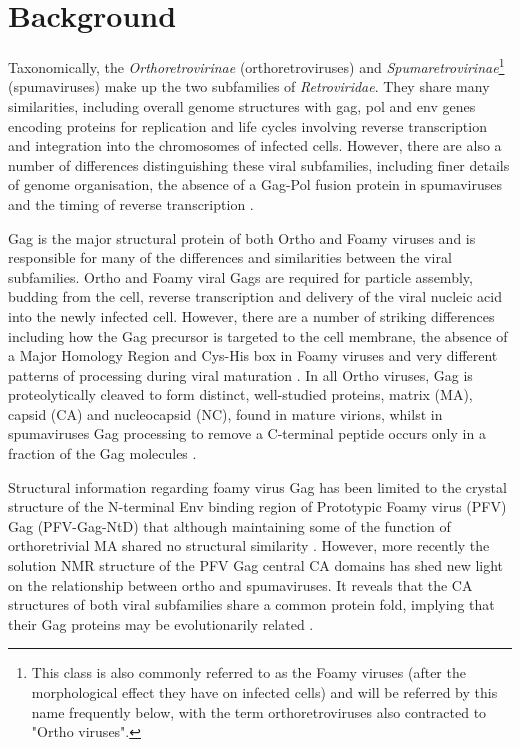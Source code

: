 \documentclass{bmcart}
\begin{document}
\section*{Background}

Taxonomically, the {\em Orthoretrovirinae} (orthoretroviruses) and {\em Spumaretrovirinae}\footnote{
This class is also commonly referred to as the Foamy viruses (after the morphological effect they have on infected cells)
and will be referred by this name frequently below, with the term orthoretroviruses also contracted to "Ortho viruses".
}
(spumaviruses) make up the two subfamilies of {\em Retroviridae}. They share many similarities, including overall genome
structures with gag, pol and env genes encoding proteins for replication and life cycles involving reverse transcription
and integration into the chromosomes of infected cells. However, there are also a number of differences distinguishing these
viral subfamilies, including finer details of genome organisation, the absence of a Gag-Pol fusion protein in spumaviruses
and the timing of reverse transcription \cite{LindemannDet11}.

Gag is the major structural protein of both Ortho and Foamy viruses and is responsible for many of the differences and
similarities between the viral subfamilies. Ortho and Foamy viral Gags are required for particle assembly, budding from the
cell, reverse transcription and delivery of the viral nucleic acid into the newly infected cell. However, there are a number
of striking differences including how the Gag precursor is targeted to the cell membrane, the absence of a Major Homology
Region and Cys-His box in Foamy viruses and very different patterns of processing during viral maturation \cite{MullersEet13}. 
In all Ortho viruses, Gag is proteolytically cleaved to form distinct, well-studied proteins, matrix (MA), capsid (CA) and 
nucleocapsid (NC), found in mature virions, whilst in spumaviruses Gag processing to remove a C-terminal peptide occurs 
only in a fraction of the Gag molecules \cite{FlugelRMet03}. 

Structural information regarding foamy virus Gag has been limited to the crystal structure of the N-terminal Env binding
region of Prototypic Foamy virus (PFV) Gag (PFV-Gag-NtD) that although maintaining some of the function of orthoretrivial
MA shared no structural similarity \cite{GoldstoneDCet13}. However, more recently the solution NMR structure of the PFV Gag 
central CA domains has shed new light on the relationship between ortho and spumaviruses. It reveals that the CA structures 
of both viral subfamilies share a common protein fold, implying that their Gag proteins may be evolutionarily related 
\cite{BallNJet16}. 
\end{document}
